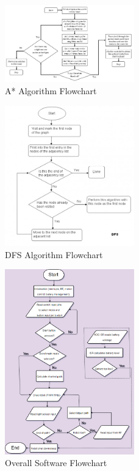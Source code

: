 \documentclass{article}
\begin{document}
\begin{figure}[!h]
\centerline{\includegraphics[width=0.5\textwidth]{a_star_diagram}}
\caption{A* Algorithm Flowchart}
\label{fig:astar}
\end{figure}

\begin{figure}[!h]
\centerline{\includegraphics[width=0.5\textwidth]{dfs_diagram}}
\caption{DFS Algorithm Flowchart}
\label{fig:dfs}
\end{figure}

\begin{figure}[!h]
\centerline{\includegraphics[width=0.5\textwidth]{software_flowchart}}
\caption{Overall Software Flowchart}
\label{fig:overallsoftchar}
\end{figure}

\vfill
\end{document}
